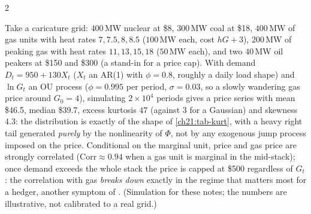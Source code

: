 \begin{paracol}{2}
\begin{example}\label{ch21:ex-stack}
Take a caricature grid: $400$\,MW nuclear at \$8, $300$\,MW coal at \$18, $400$\,MW of gas units with heat rates $7,7.5,8,8.5$ ($100$\,MW each, cost $hG+3$), $200$\,MW of
peaking gas with heat rates $11,13,15,18$ ($50$\,MW each), and two $40$\,MW oil peakers at \$150 and \$300 (a stand-in for a price cap). With demand $D_t=950+130X_t$
($X_t$ an AR(1) with $\phi=0.8$, roughly a daily load shape) and $\ln G_t$ an OU process ($\phi=0.995$ per period, $\sigma=0.03$, so a slowly wandering gas price around
$G_0=4$), simulating $2\times10^4$ periods gives a price series with mean \$46.5, median \$39.7, excess kurtosis $47$ (against $3$ for a Gaussian) and skewness $4.3$: the
distribution is exactly of the shape of \cref{ch21:tab-kurt}, with a heavy right tail generated \emph{purely} by the nonlinearity of $\Phi$, not by any exogenous jump process
imposed on the price. Conditional on the marginal unit, price and gas price are strongly correlated ($\mathrm{Corr}\approx0.94$ when a gas unit is marginal in the mid-stack); once
demand exceeds the whole stack the price is capped at \$500 regardless of $G_t$: the correlation with gas \emph{breaks down} exactly in the regime that matters most for a hedger,
another symptom of . (Simulation for these notes; the numbers are illustrative, not calibrated to a real grid.)
\end{example}


\end{paracol}
